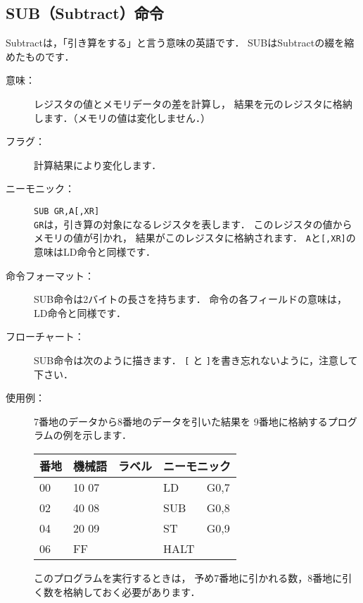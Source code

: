 \subsection{SUB（Subtract）命令}
Subtractは，「引き算をする」と言う意味の英語です．
SUBはSubtractの綴を縮めたものです．

\begin{description}
\item[意味：]レジスタの値とメモリデータの差を計算し，
結果を元のレジスタに格納します．（メモリの値は変化しません．）

\item[フラグ：]計算結果により変化します．

\item[ニーモニック：]{\tt SUB  GR,A[,XR]} \\
{\tt GR}は，引き算の対象になるレジスタを表します．
このレジスタの値からメモリの値が引かれ，
結果がこのレジスタに格納されます．
{\tt A}と{\tt [,XR]}の意味はLD命令と同様です．

\item[命令フォーマット：]SUB命令は2バイトの長さを持ちます．
命令の各フィールドの意味は，LD命令と同様です．


\item[フローチャート：]SUB命令は次のように描きます．
{\tt [} と {\tt ]}を書き忘れないように，注意して下さい．

\begin{center}
\end{center}

\item[使用例：]
7番地のデータから8番地のデータを引いた結果を
9番地に格納するプログラムの例を示します．

{\tt\small\begin{center}
\begin{tabular}{|l|l|l|l l|} \hline
番地 & 機械語 & ラベル & \multicolumn{2}{|c|}{ニーモニック} \\
\hline
00 & 10 07 & & LD   & G0,7 \\
02 & 40 08 & & SUB  & G0,8 \\
04 & 20 09 & & ST   & G0,9 \\
06 & FF    & & HALT & \\
\hline
\end{tabular}
\end{center}}

このプログラムを実行するときは，
予め7番地に引かれる数，8番地に引く数を格納しておく必要があります．
\end{description}

